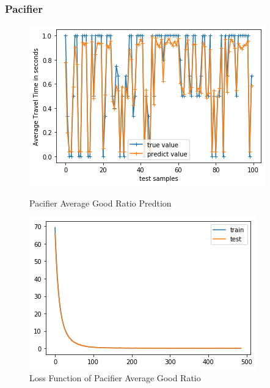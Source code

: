 \documentclass[12pt]{article}
\begin{document}
\subsubsection{Pacifier}

\begin{figure}[!htb]
   \begin{minipage}{0.48\textwidth}
     \centering
     \includegraphics[width=.8\linewidth]{pacifier_ratio_0095.png} %
     \caption{Pacifier Average Good Ratio Predtion}\label{pacigr}
   \end{minipage}\hfill
   \begin{minipage}{0.48\textwidth}
     \centering
     \includegraphics[width=.8\linewidth]{pacifier_ratio_loss.png}
     \caption{Loss Function of Pacifier Average Good Ratio}\label{pacigrloss}
   \end{minipage}
\end{figure} 
\end{document}
